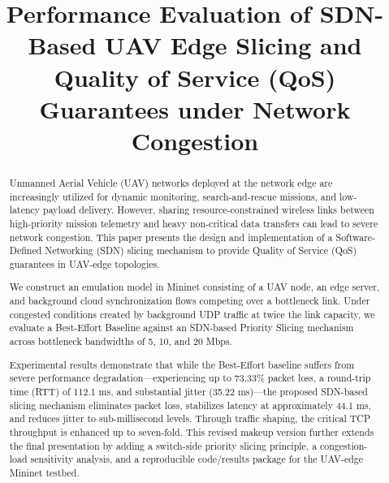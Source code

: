 \documentclass[conference]{IEEEtran}
\begin{document}
\title{Performance Evaluation of SDN-Based UAV Edge Slicing and Quality of Service (QoS) Guarantees under Network Congestion}

\author{
}

\maketitle

\begin{abstract}
Unmanned Aerial Vehicle (UAV) networks deployed at the network edge are increasingly utilized for dynamic monitoring, search-and-rescue missions, and low-latency payload delivery. However, sharing resource-constrained wireless links between high-priority mission telemetry and heavy non-critical data transfers can lead to severe network congestion. This paper presents the design and implementation of a Software-Defined Networking (SDN) slicing mechanism to provide Quality of Service (QoS) guarantees in UAV-edge topologies. 

We construct an emulation model in Mininet consisting of a UAV node, an edge server, and background cloud synchronization flows competing over a bottleneck link. Under congested conditions created by background UDP traffic at twice the link capacity, we evaluate a Best-Effort Baseline against an SDN-based Priority Slicing mechanism across bottleneck bandwidths of 5, 10, and 20 Mbps. 

Experimental results demonstrate that while the Best-Effort baseline suffers from severe performance degradation---experiencing up to 73.33\% packet loss, a round-trip time (RTT) of 112.1 ms, and substantial jitter (35.22 ms)---the proposed SDN-based slicing mechanism eliminates packet loss, stabilizes latency at approximately 44.1 ms, and reduces jitter to sub-millisecond levels. Through traffic shaping, the critical TCP throughput is enhanced up to seven-fold. This revised makeup version further extends the final presentation by adding a switch-side priority slicing principle, a congestion-load sensitivity analysis, and a reproducible code/results package for the UAV-edge Mininet testbed.
\end{abstract}
\end{document}
